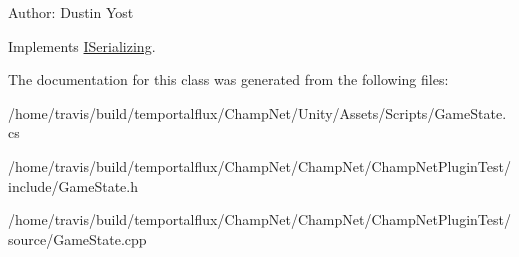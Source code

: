 Author\-: Dustin Yost 

Implements \hyperlink{interface_i_serializing_ac31a44c2358a197e774fa3f79cc80356}{I\-Serializing}.



The documentation for this class was generated from the following files\-:\begin{DoxyCompactItemize}
\item 
/home/travis/build/temportalflux/\-Champ\-Net/\-Unity/\-Assets/\-Scripts/Game\-State.\-cs\item 
/home/travis/build/temportalflux/\-Champ\-Net/\-Champ\-Net/\-Champ\-Net\-Plugin\-Test/include/Game\-State.\-h\item 
/home/travis/build/temportalflux/\-Champ\-Net/\-Champ\-Net/\-Champ\-Net\-Plugin\-Test/source/Game\-State.\-cpp\end{DoxyCompactItemize}
